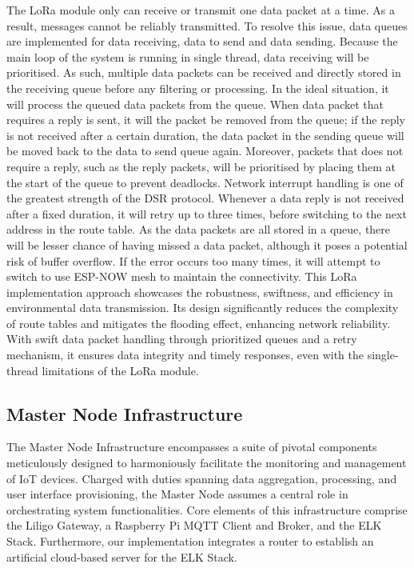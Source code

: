 The LoRa module only can receive or transmit one data packet at a time. As a result, messages cannot be reliably transmitted. To resolve this issue, data queues are implemented for data receiving, data to send and data sending. Because the main loop of the system is running in single thread, data receiving will be prioritised. As such, multiple data packets can be received and directly stored in the receiving queue before any filtering or processing. In the ideal situation, it will process the queued data packets from the queue. When data packet that requires a reply is sent, it will the packet be removed from the queue; if the reply is not received after a certain duration, the data packet in the sending queue will be moved back to the data to send queue again. Moreover, packets that does not require a reply, such as the reply packets, will be prioritised by placing them at the start of the queue to prevent deadlocks.
Network interrupt handling is one of the greatest strength of the DSR protocol. Whenever a data reply is not received after a fixed duration, it will retry up to three times, before switching to the next address in the route table. As the data packets are all stored in a queue, there will be lesser chance of having missed a data packet, although it poses a potential risk of buffer overflow. If the error occurs too many times, it will attempt to switch to use ESP-NOW mesh to maintain the connectivity.
This LoRa implementation approach showcases the robustness, swiftness, and efficiency in environmental data transmission. Its design significantly reduces the complexity of route tables and mitigates the flooding effect, enhancing network reliability. With swift data packet handling through prioritized queues and a retry mechanism, it ensures data integrity and timely responses, even with the single-thread limitations of the LoRa module. 

\subsection{Master Node Infrastructure}\label{sec:master}

The Master Node Infrastructure encompasses a suite of pivotal components meticulously designed to harmoniously facilitate the monitoring and management of IoT devices. Charged with duties spanning data aggregation, processing, and user interface provisioning, the Master Node assumes a central role in orchestrating system functionalities. Core elements of this infrastructure comprise the Liligo Gateway, a Raspberry Pi MQTT Client and Broker, and the ELK Stack. Furthermore, our implementation integrates a router to establish an artificial cloud-based server for the ELK Stack.

